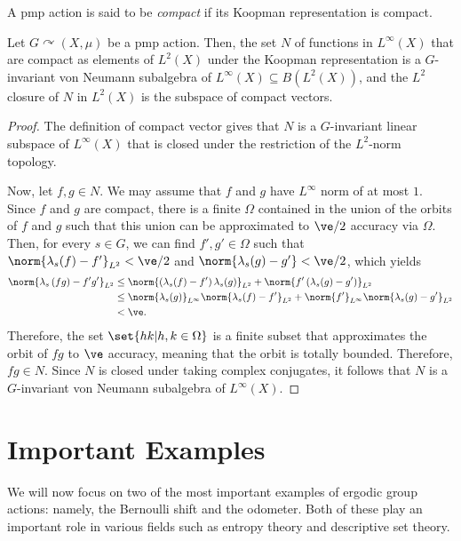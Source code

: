 \documentclass[10pt]{mypackage}
\begin{document}
\begin{definition}
  A pmp action is said to be \textit{compact} if its Koopman representation is compact.
\end{definition}
\begin{theorem}
  Let $G\curvearrowright \left( X,\mu \right)$ be a pmp action. Then, the set $N$ of functions in $L^{\infty}\left( X \right)$ that are compact as elements of $L^2\left( X \right)$ under the Koopman representation is a $G$-invariant von Neumann subalgebra of $L^{\infty}\left( X \right)\subseteq B\left( L^2\left( X \right) \right)$, and the $L^2$ closure of $N$ in $L^2\left( X \right)$ is the subspace of compact vectors.
\end{theorem}
\begin{proof}
  The definition of compact vector gives that $N$ is a $G$-invariant linear subspace of $L^{\infty}\left( X \right)$ that is closed under the restriction of the $L^2$-norm topology.

  Now, let $f,g\in N$. We may assume that $f$ and $g$ have $L^{\infty}$ norm of at most $1$. Since $f$ and $g$ are compact, there is a finite $\Omega$ contained in the union of the orbits of $f$ and $g$ such that this union can be approximated to $\ve/2$ accuracy via $\Omega$. Then, for every $s\in G$, we can find $f',g'\in \Omega$ such that $\norm{\lambda_s(f)-f'}_{L^2} < \ve/2$ and $\norm{\lambda_s(g) - g'} < \ve/2$, which yields
  \begin{align*}
    \norm{\lambda_s\left( fg \right) - f'g'}_{L^2} &\leq \norm{\left( \lambda_{s}(f)-f' \right)\lambda_s(g)}_{L^2} + \norm{f'\left( \lambda_s(g)-g' \right)}_{L^2}\\
                                                   &\leq \norm{\lambda_s(g)}_{L^{\infty}}\norm{\lambda_s(f)-f'}_{L^2} + \norm{f'}_{L^{\infty}}\norm{\lambda_s(g)-g'}_{L^2}\\
                                                   &< \ve.
  \end{align*}
  Therefore, the set $\set{hk | h,k\in \Omega}$ is a finite subset that approximates the orbit of $fg$ to $\ve$ accuracy, meaning that the orbit is totally bounded. Therefore, $fg\in N$. Since $N$ is closed under taking complex conjugates, it follows that $N$ is a $G$-invariant von Neumann subalgebra of $L^{\infty}\left( X \right)$.
\end{proof}
\section{Important Examples}%
We will now focus on two of the most important examples of ergodic group actions: namely, the Bernoulli shift and the odometer. Both of these play an important role in various fields such as entropy theory and descriptive set theory.
\end{document}
